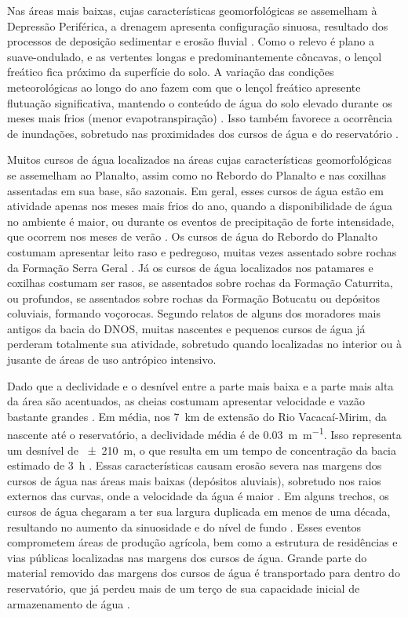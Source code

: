 Nas áreas mais baixas, cujas características geomorfológicas se assemelham à Depressão Periférica, a drenagem 
apresenta configuração sinuosa, resultado dos processos de deposição sedimentar e erosão fluvial 
\cite{PaivaEtAl2001, SutiliEtAl2009}. Como o relevo é plano a suave-ondulado, e as vertentes longas e 
predominantemente côncavas, o lençol freático fica próximo da superfície do solo. A variação das condições 
meteorológicas ao longo do ano fazem com que o lençol freático apresente flutuação significativa, mantendo o 
conteúdo de água do solo elevado durante os meses mais frios (menor evapotranspiração) 
\cite{HeldweinEtAl2009}. Isso também favorece a ocorrência de inundações, sobretudo nas proximidades dos 
cursos de água e do reservatório \cite{Goldani2006}.

Muitos cursos de água localizados na áreas cujas características geomorfológicas se assemelham ao Planalto, 
assim como no Rebordo do Planalto e nas coxilhas assentadas em sua base, são sazonais. Em geral, esses cursos 
de água estão em atividade apenas nos meses mais frios do ano, quando a disponibilidade de água no ambiente é 
maior, ou durante os eventos de precipitação de forte intensidade, que ocorrem nos meses de verão 
\cite{HeldweinEtAl2009, MouraBueno2012}. Os cursos de água do Rebordo do Planalto costumam apresentar leito 
raso e pedregoso, muitas vezes assentado sobre rochas da Formação Serra Geral \cite{SutiliEtAl2009}. Já os 
cursos de água localizados nos patamares e coxilhas costumam ser rasos, se assentados sobre rochas da Formação 
Caturrita, ou profundos, se assentados sobre rochas da Formação Botucatu ou depósitos coluviais, formando 
voçorocas. Segundo relatos de alguns dos moradores mais antigos da bacia do DNOS, muitas nascentes e pequenos 
cursos de água já perderam totalmente sua atividade, sobretudo quando localizadas no interior ou à jusante de 
áreas de uso antrópico intensivo.

Dado que a declividade e o desnível entre a parte mais baixa e a parte mais alta da área são acentuados, as 
cheias costumam apresentar velocidade e vazão bastante grandes \cite{PaivaEtAl2001, SutiliEtAl2009}. Em média, 
nos \SI{7}{\km} de extensão do Rio Vacacaí-Mirim, da nascente até o reservatório, a declividade média é de 
\SI{0,03}{\m\per\m}. Isso representa um desnível de \SI{\pm210}{\m}, o que resulta em um tempo de concentração 
da bacia estimado de \SI{3}{\hour} \cite{PaivaEtAl2001}. Essas características causam erosão severa nas 
margens dos cursos de água nas áreas mais baixas (depósitos aluviais), sobretudo nos raios externos das 
curvas, onde a velocidade da água é maior \cite{SutiliEtAl2009}. Em alguns trechos, os cursos de água chegaram 
a ter sua largura duplicada em menos de uma década, resultando no aumento da sinuosidade e do nível de fundo 
\cite{PaivaEtAl2001}. Esses eventos comprometem áreas de produção agrícola, bem como a estrutura de 
residências e vias públicas localizadas nas margens dos cursos de água. Grande parte do material removido das 
margens dos cursos de água é transportado para dentro do reservatório, que já perdeu mais de 
um terço de sua capacidade inicial de armazenamento de água \cite{DillEtAl2004}.

